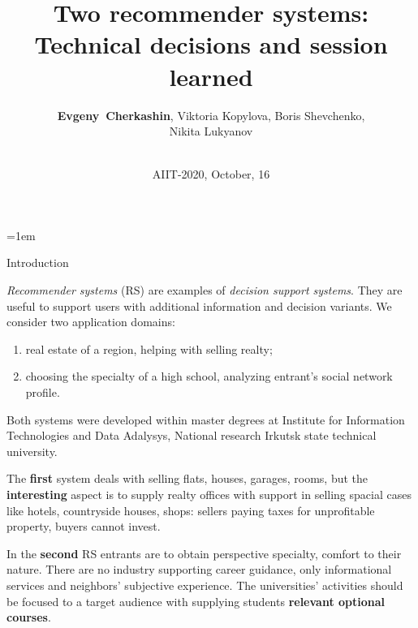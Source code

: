 \documentclass[10pt,dvipsnames]{beamer}
\def\remph#1{\textcolor{Mahogany}{\bfseries #1}}
\begin{document}
\parindent=1em
\title{Two recommender systems: Technical decisions and session learned}
\author{
\def\and{, }
\remph{Evgeny~Cherkashin}\and
Viktoria Kopylova\and
Boris Shevchenko\and\\
Nikita Lukyanov}


\date{${}$\\\vspace{2em}AIIT-2020, October, 16}

\maketitle
\begin{frame}{Introduction}

  \emph{Recommender systems} (RS) are examples of \emph{decision support systems}. They are useful to support users with additional information and decision variants.  We consider two application domains:
  \begin{enumerate}
  \item real estate of a region, helping with selling realty;
  \item choosing the specialty of a high school, analyzing entrant's social network profile.
\end{enumerate}
Both systems were developed within master degrees at Institute for Information Technologies and Data Adalysys, National research Irkutsk state technical university.

The \textbf{first} system deals with selling flats, houses, garages, rooms, but the \textbf{interesting} aspect is to supply realty offices with support in selling spacial cases like hotels, countryside houses, shops: sellers paying taxes for unprofitable property, buyers cannot invest.

In the \textbf{second} RS entrants are to obtain perspective specialty, comfort to their nature.  There are no industry supporting career guidance, only informational services and neighbors' subjective experience.  The universities' activities should be focused to a target audience with supplying students \textbf{relevant optional courses}.


\end{frame}
\end{document}
